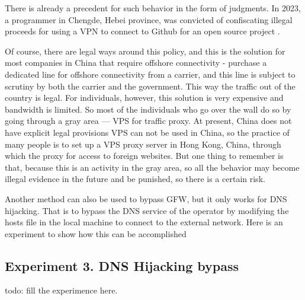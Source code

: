 \documentclass[11pt]{article}
\begin{document}
There is already a precedent for such behavior in the form of judgments. In 2023,
a programmer in Chengde, Hebei province, was convicted of confiscating illegal
proceeds for using a VPN to connect to Github for an open source project
\cite{HeBeiPolice}.

Of course, there are legal ways around this policy, and this is the solution for
most companies in China that require offshore connectivity - purchase a
dedicated line for offshore connectivity from a carrier, and this line is
subject to scrutiny by both the carrier and the government. This way the traffic
out of the country is legal. For individuals, however, this solution is very
expensive and bandwidth is limited. So most of the individuals who go over the
wall do so by going through a gray area --- VPS for traffic proxy. At present,
China does not have explicit legal provisions VPS can not be used in China, so
the practice of many people is to set up a VPS proxy server in Hong Kong, China,
through which the proxy for access to foreign websites. But one thing to
remember is that, because this is an activity in the gray area, so all the
behavior may become illegal evidence in the future and be punished, so there is
a certain risk.

Another method can also be used to bypass GFW, but it only works for DNS
hijacking. That is to bypass the DNS service of the operator by modifying the
hosts file in the local machine to connect to the external network. Here is an
experiment to show how this can be accomplished

\subsection{Experiment 3. DNS Hijacking bypass}
todo: fill the experimence here.
\end{document}
